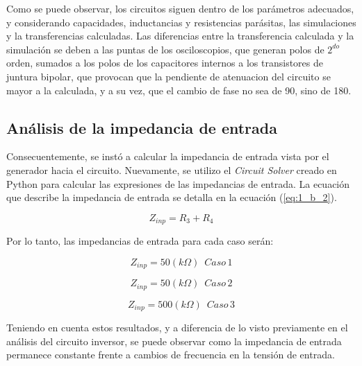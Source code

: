 Como se puede observar, los circuitos siguen dentro de los parámetros
adecuados, y considerando capacidades, inductancias y resistencias
parásitas, las simulaciones y la transferencias calculadas. Las diferencias
entre la transferencia calculada y la simulación se deben a las puntas
de los osciloscopios, que generan polos de $2^{do}$ orden, sumados
a los polos de los capacitores internos a los transistores de juntura
bipolar, que provocan que la pendiente de atenuacion del circuito
se mayor a la calculada, y a su vez, que el cambio de fase no sea
de 90\textdegree , sino de 180\textdegree .

\subsection{Análisis de la impedancia de entrada}

Consecuentemente, se instó a calcular la impedancia de entrada vista
por el generador hacia el circuito. Nuevamente, se utilizo el \emph{Circuit
Solver }creado en Python para calcular las expresiones de las impedancias
de entrada. La ecuación que describe la impedancia de entrada se detalla
en la ecuación (\ref{eq:1_b_2}).

\begin{equation}
Z_{inp}=R_{3}+R_{4}\label{eq:1_b_2}
\end{equation}

Por lo tanto, las impedancias de entrada para cada caso serán:

\[
Z_{inp}=50(k\Omega)\,\,\,Caso\,1
\]

\[
Z_{inp}=50(k\Omega)\,\,\,Caso\,2
\]

\[
Z_{inp}=500(k\Omega)\,\,\,Caso\,3
\]

Teniendo en cuenta estos resultados, y a diferencia de lo visto previamente
en el análisis del circuito inversor, se puede observar como la impedancia
de entrada permanece constante frente a cambios de frecuencia en la
tensión de entrada.

